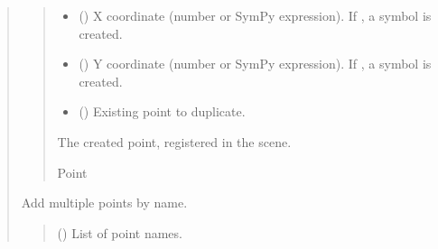 \documentclass[letterpaper,10pt,english]{sphinxmanual}
\begin{document}
\begin{quote}
\begin{fulllineitems}
\begin{fulllineitems}
\begin{quote}
\begin{description}
\begin{itemize}
\item {} 
\sphinxAtStartPar
{} (\sphinxstyleliteralemphasis{\sphinxupquote{ | }}\sphinxstyleliteralemphasis{\sphinxupquote{ | }}\sphinxstyleliteralemphasis{\sphinxupquote{ | }}) \textendash{} X coordinate (number or SymPy expression). If , a symbol is created.

\item {} 
\sphinxAtStartPar
{} (\sphinxstyleliteralemphasis{\sphinxupquote{ | }}\sphinxstyleliteralemphasis{\sphinxupquote{ | }}\sphinxstyleliteralemphasis{\sphinxupquote{ | }}) \textendash{} Y coordinate (number or SymPy expression). If , a symbol is created.

\item {} 
\sphinxAtStartPar
{} (\sphinxstyleliteralemphasis{\sphinxupquote{ | }}) \textendash{} Existing point to duplicate.

\end{itemize}

\sphinxAtStartPar
The created point, registered in the scene.

\sphinxAtStartPar
Point

\end{description}\end{quote}

\end{fulllineitems}


\begin{fulllineitems}
\label{\detokenize{pygeox:pygeox.add_objects.AddNamespace.points}}
\pysigstartsignatures
\pysiglinewithargsret
{}
{}
{}
\pysigstopsignatures
\sphinxAtStartPar
Add multiple points by name.
\begin{quote}\begin{description}
\sphinxAtStartPar
{} (\sphinxstyleliteralemphasis{\sphinxupquote{{[}}}\sphinxstyleliteralemphasis{\sphinxupquote{{]}}}) \textendash{} List of point names.


\end{description}
\end{quote}
\end{fulllineitems}
\end{fulllineitems}
\end{quote}
\end{document}
